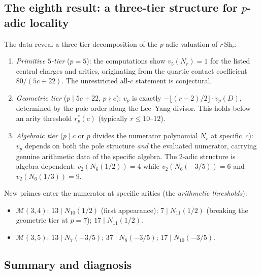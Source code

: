 \documentclass[11pt]{article}
\newcommand{\cM}{\mathcal{M}}
\begin{document}
\subsection*{The eighth result: a three-tier structure for
$p$-adic locality}

The data reveal a three-tier decomposition of the $p$-adic
valuation of $r\,\mathrm{Sh}_r$:
\begin{enumerate}[label=(\roman*)]
\item \emph{Primitive $5$-tier} ($p = 5$): the computations show
  $v_5(N_r) = 1$ for the listed central charges and arities,
  originating from the quartic contact coefficient
  $80/(5c{+}22)$.  The unrestricted all-$c$ statement is
  conjectural.

\item \emph{Geometric tier} ($p \mid 5c{+}22$,
  $p \nmid c$): $v_p$ is exactly
  $-\lfloor(r{-}2)/2\rfloor \cdot v_p(D)$, determined by
  the pole order along the Lee--Yang divisor.  This holds
  below an arity threshold $r_p^*(c)$ (typically
  $r \le 10$--$12$).

\item \emph{Algebraic tier} ($p \mid c$ or $p$ divides the
  numerator polynomial $N_r$ at specific~$c$): $v_p$ depends
  on both the pole structure \emph{and} the evaluated
  numerator, carrying genuine arithmetic data of the specific
  algebra.  The $2$-adic structure is algebra-dependent:
  $v_2(N_6(1/2)) = 4$ while $v_2(N_6(-3/5)) = 6$ and
  $v_2(N_6(1/3)) = 9$.
\end{enumerate}

New primes enter the numerator at specific arities (the
\emph{arithmetic thresholds}):
\begin{itemize}[leftmargin=1.8em]
\item $\cM(3,4)$: $13 \mid N_{10}(1/2)$ (first appearance);
  $7 \mid N_{11}(1/2)$ (breaking the geometric tier at $p = 7$);
  $17 \mid N_{11}(1/2)$.
\item $\cM(3,5)$: $13 \mid N_7(-3/5)$;
  $37 \mid N_8(-3/5)$; $17 \mid N_{10}(-3/5)$.
\end{itemize}


\subsection*{Summary and diagnosis}
\end{document}
